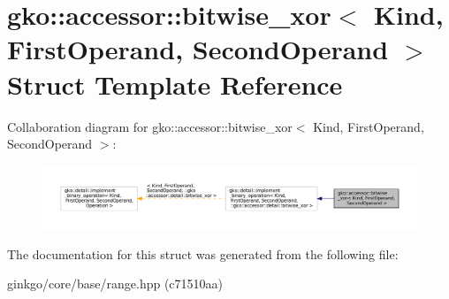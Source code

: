 \hypertarget{structgko_1_1accessor_1_1bitwise__xor}{}\section{gko\+:\+:accessor\+:\+:bitwise\+\_\+xor$<$ Kind, First\+Operand, Second\+Operand $>$ Struct Template Reference}
\label{structgko_1_1accessor_1_1bitwise__xor}


Collaboration diagram for gko\+:\+:accessor\+:\+:bitwise\+\_\+xor$<$ Kind, First\+Operand, Second\+Operand $>$\+:
\nopagebreak
\begin{figure}[H]
\begin{center}
\leavevmode
\includegraphics[width=350pt]{structgko_1_1accessor_1_1bitwise__xor__coll__graph}
\end{center}
\end{figure}


The documentation for this struct was generated from the following file\+:\begin{DoxyCompactItemize}
\item 
ginkgo/core/base/range.\+hpp (c71510aa)\end{DoxyCompactItemize}
